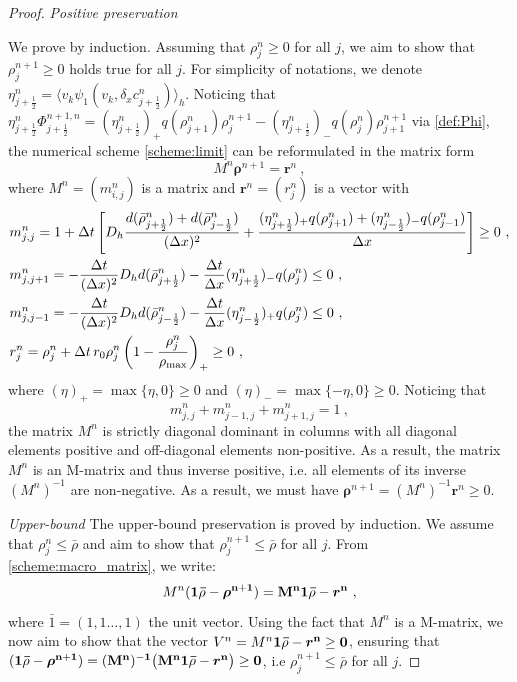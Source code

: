 \documentclass[review,onefignum,onetabnum]{siamart220329}
\newcommand {\dt}   {\Delta t}
\newcommand {\dx}   {\Delta x}
\newcommand{\brho}{\boldsymbol{\rho}}
\newcommand{\br}{\boldsymbol{r}}
\newcommand{\DP}{\color{myblue}}
\begin{document}
\begin{proof}
\textit{Positive preservation}

We prove by induction. 
Assuming that $\rho_j^n \ge0$ for all $j$, we aim to show that $\rho_j^{n+1} \ge0$ holds true for all $j$.
For simplicity of notations, we denote $\eta_{j+\frac12}^n = \langle v_k \psi_1(v_k, \delta_x c_{j+\frac12}^n)\rangle_h$.
Noticing that $\eta_{j+\frac12}^n\Phi_{j+\frac12}^{n+1,n}=(\eta_{j+\frac12}^n)_+ q(\rho_{j+1}^n)\rho_j^{n+1} - (\eta_{j+\frac12}^n)_- q(\rho_{j}^n)\rho_{j+1}^{n+1}$ via \cref{def:Phi}, the numerical scheme \cref{scheme:limit} can be reformulated in the matrix form
\begin{equation}\label{scheme:macro_matrix}
    M^n \brho^{n+1} = \br^n\ ,
\end{equation}
where $M^n = (m_{i,j}^n)$ is a {\color{red}{tridiagonal}} matrix and $\br^n = (r_j^n)$ is a vector with
\begin{align*}
    & m_{j,j}^n = 1 + \dt 
    \left[
    D_h\frac{
    d(\bar{\rho}_{j+\frac12}^n) + d(\bar{\rho}_{j-\frac12}^n)
    }{(\dx)^2} + 
    \frac{
    (\eta_{j+\frac12}^n)_+ q(\rho_{j+1}^n) + (\eta_{j-\frac12}^n)_- q(\rho_{j-1}^n)}{\dx}
    \right] \ge 0\ , \nonumber\\
    & m_{j,j+1}^n = -\frac{\dt}{(\dx)^2} D_h d(\bar{\rho}_{j+\frac12}^n) - \frac{\dt}{\dx} (\eta_{j+\frac12}^n)_- q(\rho_j^n) \le0\ , \nonumber\\
    & m_{j,j-1}^n = -\frac{\dt}{(\dx)^2} D_h d(\bar{\rho}_{j-\frac12}^n) - \frac{\dt}{\dx} (\eta_{j-\frac12}^n)_+ q(\rho_j^n)\le0\ ,\nonumber\\
    & r_j^n = \rho_j^n + \dt \, r_0 \rho_j^{n}\left(1 - \frac{\rho_j^n}{\rho_{\rm max}}\right)_+ \ge 0\ , %
\end{align*}
where $(\eta)_+ = \max\{\eta, 0\}\ge0$ and $(\eta)_-=\max\{-\eta, 0\}\ge0$.
Noticing that 
\begin{equation*}
    m_{j,j}^n + m_{j-1,j}^n + m_{j+1,j}^n = 1\ ,
\end{equation*}
the matrix $M^n$ is strictly diagonal dominant in columns with all diagonal elements positive and off-diagonal elements non-positive. 
As a result, the matrix $M^n$ is an M-matrix and thus inverse positive, i.e. all elements of its inverse $(M^n)^{-1}$ are non-negative. 
As a result, we must have $\brho^{n+1} =(M^n)^{-1}\br^n\ge0$. 

{\DP \textit{Upper-bound}
The upper-bound preservation is proved by induction. We assume that $\rho_j^n \leq \bar{\rho}$ and aim to show that $\rho_j^{n+1} \leq \bar{\rho}$ for all $j$. From \eqref{scheme:macro_matrix}, we write:
$$
    M^n (\bf{1} \bar{\rho} - \brho^{n+1}) = M^n \bf{1} \bar{\rho} - \br^n\ ,
$$
where $\bar{1} = (1,1 \hdots,1)$ the unit vector. Using the fact that $M^n$ is a M-matrix, we now aim to show that the vector $V^n = M^n \bf{1} \bar{\rho} - \br^n \geq 0$, ensuring that $(\bf{1} \bar{\rho} - \brho^{n+1}) = (M^n)^{-1} \big(M^n \bf{1} \bar{\rho} - \br^n \big) \geq 0$, i.e $\rho^{n+1}_j \leq \bar{\rho}$ for all $j$.

}
\end{proof}
\end{document}
